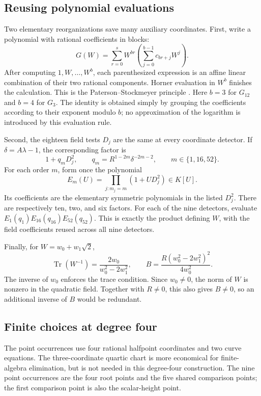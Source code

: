 \subsection{Reusing polynomial evaluations}

Two elementary reorganizations save many auxiliary coordinates.  First,
write a polynomial with rational coefficients in blocks:
\[
 G(W)=\sum_{r=0}^s W^{br}
               \left(\sum_{j=0}^{b-1}c_{br+j}W^j\right).
\]
After computing $1,W,\ldots,W^b$, each parenthesized expression is an
affine linear combination of their two rational components.  Horner
evaluation in $W^b$ finishes the calculation.  This is the
Paterson--Stockmeyer principle \cite{PatersonStockmeyer1973}.  Here $b=3$
for $G_{12}$ and $b=4$ for $G_3$.  The identity is obtained simply by
grouping the coefficients according to their exponent modulo $b$; no
approximation of the logarithm is introduced by this evaluation rule.

Second, the eighteen field tests $D_j$ are the same at every coordinate
detector.  If $\delta=A\lambda-1$, the corresponding factor is
\[
 1+q_mD_j^2,\qquad q_m=R^{1-2m}\delta^{-2m-2},
 \qquad m\in\{1,16,52\}.
\]
For each order $m$, form once the polynomial
\[
 E_m(U)=\prod_{j:m_j=m}(1+UD_j^2)\in K[U].
\]
Its coefficients are the elementary symmetric polynomials in the listed
$D_j^2$.  There are respectively ten, two, and six factors.  For each of
the nine detectors, evaluate $E_1(q_1)E_{16}(q_{16})E_{52}(q_{52})$.
This is exactly the product defining $W$, with the field coefficients
reused across all nine detectors.

Finally, for $W=w_0+w_1\sqrt2$,
\[
 \operatorname{Tr}(W^{-1})=\frac{2w_0}{w_0^2-2w_1^2},\qquad
 B=\frac{R(w_0^2-2w_1^2)^2}{4w_0^2}.
\]
The inverse of $w_0$ enforces the trace condition.  Since $w_0\ne0$,
the norm of $W$ is nonzero in the quadratic field.  Together with
$R\ne0$, this also gives $B\ne0$, so an additional inverse of $B$
would be redundant.

\subsection{Finite choices at degree four}

The point occurrences use four rational halfpoint coordinates and two
curve equations.  The three-coordinate quartic chart is more economical
for finite-algebra elimination, but is not needed in this degree-four
construction.  The nine point occurrences are the four root points and
the five shared comparison points; the first comparison point is also
the scalar-height point.

